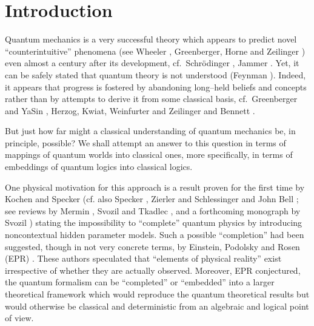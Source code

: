 \section{Introduction}

Quantum mechanics is a very successful theory which appears to
predict novel ``counterintuitive'' phenomena (see Wheeler \cite{wheeler},
Greenberger, Horne and Zeilinger \cite{green-horn-zei}) even
almost a century after
its development, cf.\ Schr{\"o}dinger \cite{schrodinger},
Jammer \cite{jammer:66,jammer1}.
Yet, it can be safely stated that quantum
theory is not understood (Feynman \cite{feynman-law}).
Indeed, it appears that progress is fostered by abandoning long--held
beliefs and concepts rather than by attempts to derive it from some
classical basis, cf.\ Greenberger and YaSin \cite{greenberger2},
Herzog, Kwiat, Weinfurter and Zeilinger \cite{hkwz}
and Bennett \cite{benn:94}.


But just how far might a classical understanding of quantum mechanics
be, in principle, possible?
We shall attempt an answer to this question in terms of mappings of quantum
worlds into
classical ones, more specifically, in terms of embeddings of quantum logics
into classical logics.

One physical motivation for this approach is a result proven for the
first time by  Kochen and Specker
\cite{kochen1} (cf. also Specker \cite{specker-60}, Zierler and
Schlessinger \cite{ZirlSchl-65} and John Bell \cite{bell-66}; see  reviews
by Mermin
\cite{mermin-93}, Svozil and Tkadlec \cite{svozil-tkadlec}, and a forthcoming
monograph by Svozil \cite{svozil-ql})
stating  the impossibility to ``complete'' quantum physics
by introducing noncontextual hidden parameter models.
Such a possible ``completion'' had been suggested, though in not very
concrete terms, by Einstein, Podolsky and Rosen (EPR) \cite{epr}. These authors
speculated that ``elements of physical reality'' exist irrespective of
whether they are actually observed. Moreover, EPR conjectured, the
quantum formalism can be ``completed'' or ``embedded'' into a larger
theoretical framework
which would reproduce the quantum theoretical results but would otherwise
be classical and deterministic from an algebraic and logical point of view.

